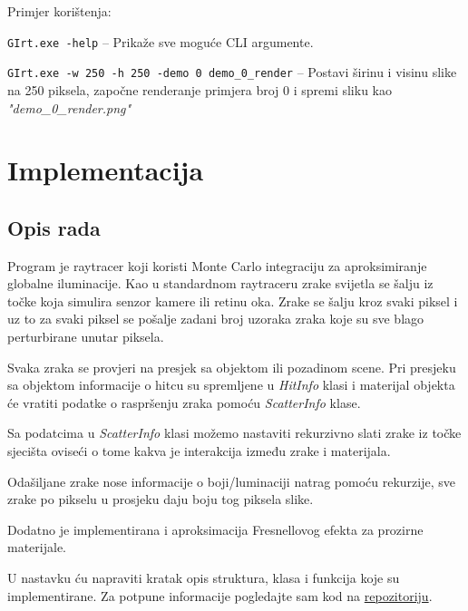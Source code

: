 \documentclass[
12pt, %
oneside, %
english, %
singlespacing, %
parskip, %
headsepline, %
chapterinoneline, %
consistentlayout, %
]{MastersDoctoralThesis} %
\begin{document}
\vspace{2cm}

Primjer korištenja:

\texttt{GIrt.exe -help} \quad -- Prikaže sve moguće CLI argumente.

\texttt{GIrt.exe -w 250 -h 250 -demo 0 demo_0_render} \quad -- Postavi širinu i visinu
slike na 250 piksela, započne renderanje primjera broj 0 i spremi sliku kao \emph{"demo\_0\_render.png"}

\vspace{2cm}

{\let\clearpage\relax \chapter{Implementacija}}

\section{Opis rada}
Program je raytracer koji koristi Monte Carlo integraciju za aproksimiranje globalne iluminacije.
Kao u standardnom raytraceru zrake svijetla se šalju iz točke koja simulira senzor kamere
ili retinu oka. Zrake se šalju kroz svaki piksel i uz to za svaki piksel se pošalje
zadani broj uzoraka zraka koje su sve blago perturbirane unutar piksela.

Svaka zraka se provjeri na presjek sa objektom ili pozadinom scene. Pri presjeku sa objektom
informacije o hitcu su spremljene u \emph{HitInfo} klasi i materijal objekta će vratiti podatke
o raspršenju zraka pomoću \emph{ScatterInfo} klase.

Sa podatcima u \emph{ScatterInfo} klasi možemo nastaviti rekurzivno slati zrake iz točke sjecišta
oviseći o tome kakva je interakcija između zrake i materijala.

Odašiljane zrake nose informacije o boji/luminaciji natrag pomoću rekurzije, sve zrake po pikselu
u prosjeku daju boju tog piksela slike.

Dodatno je implementirana i aproksimacija Fresnellovog efekta za prozirne materijale.

\vspace*{2cm}

U nastavku ću napraviti kratak opis struktura, klasa i funkcija koje su implementirane. Za
potpune informacije pogledajte sam kod na \href{https://github.com/Lame-een/globalillum}{repozitoriju}.
\end{document}
